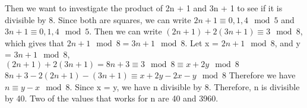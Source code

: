 \documentclass[12pt,letterpaper]{hmcpset}
\begin{document}
\begin{solution}
\newline\newline Then we want to investigate the product of 2n + 1 and 3n + 1 to see if it is divisible by 8. Since both are squares, we can write $2n + 1 \equiv {0, 1, 4} \mod 5$ and $3n + 1 \equiv {0, 1, 4} \mod 5$. Then we can write $(2n+1)+2(3n+1)\equiv 3 \mod 8$, which gives that $2n + 1 \mod 8 = 3n + 1 \mod 8$. 
\newline Let x = $2n + 1 \mod 8$, and y = $3n + 1 \mod 8$, 
\newline $(2n+1)+2(3n+1) = 8n + 3 \equiv 3 \mod 8 \equiv x + 2y \mod 8$
\newline $8n + 3 - 2(2n+1) - (3n + 1) \equiv x + 2y - 2x - y \mod 8$
\newline Therefore we have $n \equiv y - x \mod 8$. Since x = y, we have n divisible by 8. Therefore, n is divisible by 40. Two of the values that works for n are 40 and 3960.
\end{solution}
\end{document}
